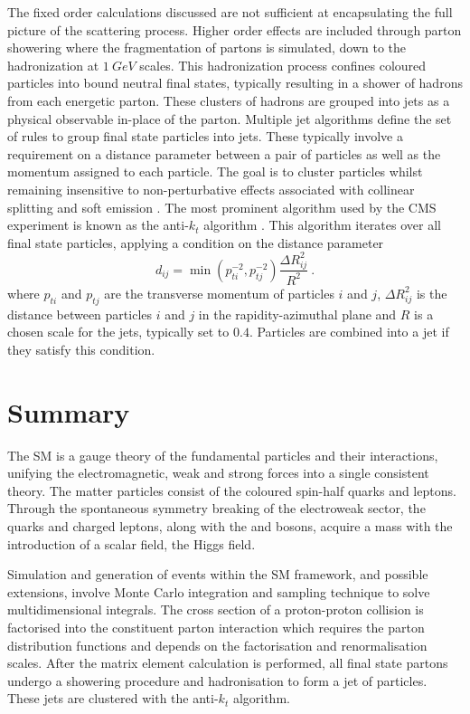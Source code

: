 The fixed order calculations discussed are not sufficient at encapsulating the full picture of the scattering process. Higher order effects are included through parton showering where the fragmentation of partons is simulated, down to the hadronization at $\SI{1}{GeV}$ scales. This hadronization process confines coloured particles into bound neutral final states, typically resulting in a shower of hadrons from each energetic parton. These clusters of hadrons are grouped into jets as a physical observable in-place of the parton. Multiple jet algorithms define the set of rules to group final state particles into jets. These typically involve a requirement on a distance parameter between a pair of particles as well as the momentum assigned to each particle. The goal is to cluster particles whilst remaining insensitive to non-perturbative effects associated with collinear splitting and soft emission \cite{Buckley:2011ms}. The most prominent algorithm used by the CMS experiment is known as the anti-$k_t$ algorithm \cite{Salam:2009jx}. This algorithm iterates over all final state particles, applying a condition on the distance parameter
%
\begin{equation}
    d_{ij} = \min\left(p_{ti}^{-2},p_{tj}^{-2}\right)\frac{\Delta R_{ij}^2}{R^2}\ .
\end{equation}
%
where $p_{ti}$ and $p_{tj}$ are the transverse momentum of particles $i$ and $j$, $\Delta R_{ij}^2$ is the distance between particles $i$ and $j$ in the rapidity-azimuthal plane and $R$ is a chosen scale for the jets, typically set to $0.4$. Particles are combined into a jet if they satisfy this condition.


\section{Summary}

The SM is a gauge theory of the fundamental particles and their interactions,
unifying the electromagnetic, weak and strong forces into a single consistent
theory. The matter particles consist of the coloured spin-half quarks and
leptons. Through the spontaneous symmetry breaking of the electroweak sector,
the quarks and charged leptons, along with the \PW and \PZ bosons, acquire a
mass with the introduction of a scalar field, the Higgs field.

Simulation and generation of events within the SM framework, and possible
extensions, involve Monte Carlo integration and sampling technique to solve
multidimensional integrals. The cross section of a proton-proton collision is
factorised into the constituent parton interaction which requires the parton
distribution functions and depends on the factorisation and renormalisation
scales. After the matrix element calculation is performed, all final state
partons undergo a showering procedure and hadronisation to form a jet of
particles. These jets are clustered with the anti-$k_t$ algorithm.
